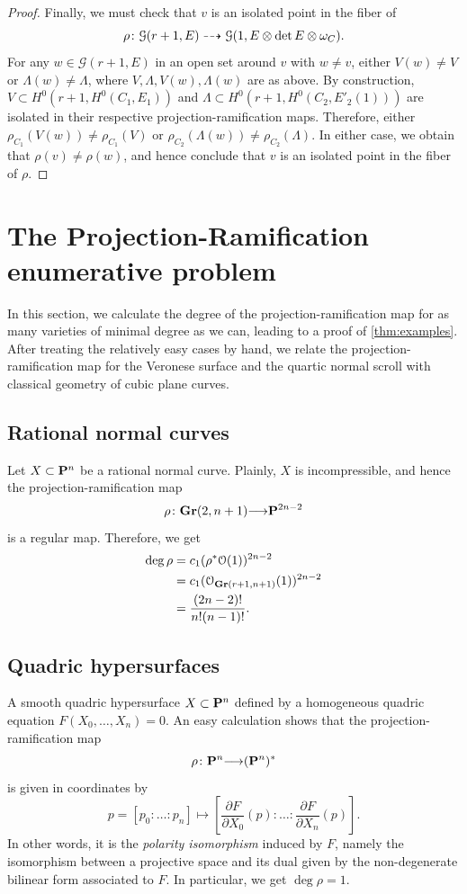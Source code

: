 \documentclass[11pt,reqno]{amsart}
\theoremstyle{plain}
\theoremstyle{definition}
\theoremstyle{remark}
\numberwithin{equation}{section}
\renewcommand{\to}{{\longrightarrow}}
\numberwithin{equation}{section}
\renewcommand{\O}{\mathcal O}
\begin{document}
\begin{proof}
  Finally, we must check that $v$ is an isolated point in the fiber of
  \[ \rho \from \mathcal G(r+1, E) \dashrightarrow \mathcal G(1, E \otimes \det E \otimes \omega_C).\]
  For any $w \in \mathcal G(r+1, E)$ in an open set around $v$ with $w \neq v$, either $V(w) \neq V$ or $\Lambda(w) \neq \Lambda$, where $V, \Lambda, V(w), \Lambda(w)$ are as above.
  By construction, $V \subset H^0(r+1, H^0(C_1, E_1))$ and $\Lambda \subset H^0(r+1, H^0(C_2, E'_2(1)))$ are isolated in their respective projection-ramification maps.
  Therefore, either $\rho_{C_1} (V(w)) \neq \rho_{C_1}(V)$ or $\rho_{C_2}(\Lambda(w)) \neq \rho_{C_2}(\Lambda)$.
  In either case, we obtain that $\rho(v) \neq \rho(w)$, and hence conclude that $v$ is an isolated point in the fiber of $\rho$.
\end{proof}


\section{The Projection-Ramification enumerative problem} %
\label{sec:enumerativeproblems}
In this section, we calculate the degree of the projection-ramification map for as many varieties of minimal degree as we can, leading to a proof of \autoref{thm:examples}.
After treating the relatively easy cases by hand, we relate the projection-ramification map for the Veronese surface and the quartic normal scroll with classical geometry of cubic plane curves.

\subsection{Rational normal curves}
\label{sec:arnc}
Let $X \subset \P^n$ be a rational normal curve.
Plainly, $X$ is incompressible, and hence the projection-ramification map
\[ \rho \from \Gr(2, n+1) \to \P^{2n-2}\]
is a regular map.
Therefore, we get
\begin{align*}
  \deg \rho &= c_1(\rho^* \O(1))^{2n-2}\\
            &= c_1(\O_{\Gr(r+1, n+1)}(1))^{2n-2} \\
            &= \frac{(2n-2)!}{n!(n-1)!}.
\end{align*}

\subsection{Quadric hypersurfaces} %
\label{sec:aquadricsurface}
A smooth quadric hypersurface $X \subset \P^{n}$ defined by a homogeneous quadric equation $F(X_{0},\dots,X_n) = 0$.
An easy calculation shows that the projection-ramification map
\[ \rho \from \P^n \to (\P^n)^*\]
is given in coordinates by
\[ p = [p_0: \dots:p_n] \mapsto \left[ \frac{\partial F}{\partial X_0}(p): \dots: \frac{\partial F}{\partial X_n}(p) \right].\]
In other words, it is the \emph{polarity isomorphism} induced by $F$, namely the isomorphism between a projective space and its dual given by the non-degenerate bilinear form associated to $F$.
In particular, we get $\deg \rho = 1$.
\end{document}
